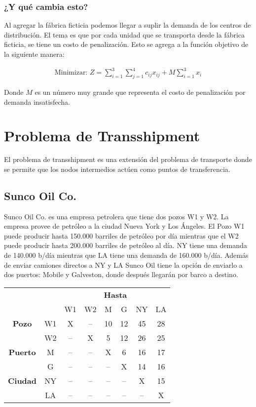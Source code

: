 \documentclass[12pt]{article}
\begin{document}
\subsubsection{¿Y qué cambia esto?}

Al agregar la fábrica ficticia podemos llegar a suplir la demanda de los centros de distribución. El tema es que por cada unidad que se transporta desde la fábrica ficticia, se tiene un costo de penalización. Esto se agrega a la función objetivo de la siguiente manera:

\begin{align*}
\text{Minimizar: } Z = \sum_{i=1}^3 \sum_{j=1}^4 c_{ij}x_{ij} + M \sum_{i=1}^3 x_{i}
\end{align*}

Donde $M$ es un número muy grande que representa el costo de penalización por demanda insatisfecha.

\section{Problema de Transshipment}

El problema de transshipment es una extensión del problema de transporte donde se permite que los nodos intermedios actúen como puntos de transferencia.

\subsection{Sunco Oil Co.}

Sunco Oil Co. es una empresa petrolera que tiene dos pozos W1 y W2. La empresa provee de petróleo a la ciudad Nueva York y Los Ángeles. El Pozo W1 puede producir hasta 150.000 barriles de petróleo por día mientras que el W2 puede producir hasta 200.000 barriles de petróleo al día. NY tiene una demanda de 140.000 b/día mientras que LA tiene una demanda de 160.000 b/día. Además de enviar camiones directos a NY y LA Sunco Oil tiene la opción de enviarlo a dos puertos: Mobile y Galveston, donde después llegarán por barco a destino. \\

\begin{center}
\begin{tabular}{cccccccc}
\toprule
 & & \multicolumn{6}{c}{\textbf{Hasta}} \\
 & & W1 & W2 & M & G & NY & LA \\
\midrule
\textbf{Pozo} & W1 & X & -- & 10 & 12 & 45 & 28 \\
 & W2 & -- & X & 5 & 12 & 26 & 25 \\
\midrule
\textbf{Puerto} & M & -- & -- & X & 6 & 16 & 17 \\
 & G & -- & -- & -- & X & 14 & 16 \\
\midrule
\textbf{Ciudad} & NY & -- & -- & -- & -- & X & 15 \\
 & LA & -- & -- & -- & -- & -- & X \\
\bottomrule
\end{tabular}
\end{center}
\end{document}

